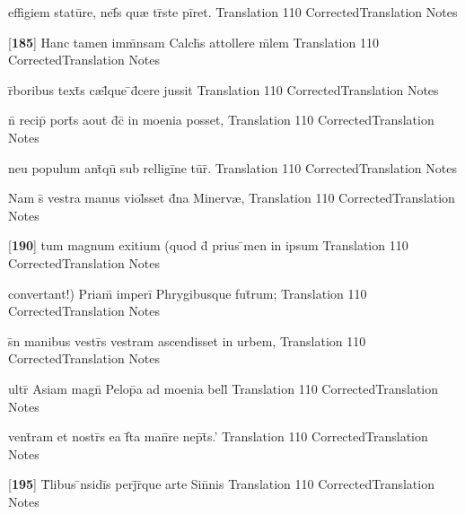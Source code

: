 \latline
  {effigiem statu\={}re, nef\={}s qu{\ae} tr\={\macron {\i}}ste pi\={}ret.}
  { Translation }
  {110}
  { CorrectedTranslation }
  { Notes }


\latline
  {[\textbf{185}] Hanc tamen imm\={}nsam Calch\={}s attollere m\={}lem}
  { Translation }
  {110}
  { CorrectedTranslation }
  { Notes }


\latline
  {r\={}boribus text\={\macron {\i}}s c{\ae}l\={}que \={}d\={}cere jussit}
  { Translation }
  {110}
  { CorrectedTranslation }
  { Notes }


\latline
  {n\={} recip\={\macron {\i}} port\={\macron {\i}}s aout d\={}c\={\macron {\i}} in moenia posset,}
  { Translation }
  {110}
  { CorrectedTranslation }
  { Notes }


\latline
  {neu populum ant\={\macron {\i}}qu\={} sub relligi\={}ne tu\={}r\={\macron {\i}}.}
  { Translation }
  {110}
  { CorrectedTranslation }
  { Notes }


\latline
  {Nam s\={\macron {\i}} vestra manus viol\={}sset d\={}na Minerv{\ae},}
  { Translation }
  {110}
  { CorrectedTranslation }
  { Notes }


\latline
  {[\textbf{190}] tum magnum exitium (quod d\={\macron {\i}} prius \={}men in ipsum}
  { Translation }
  {110}
  { CorrectedTranslation }
  { Notes }


\latline
  {convertant!) Priam\={\macron {\i}} imperi\={} Phrygibusque fut\={}rum;}
  { Translation }
  {110}
  { CorrectedTranslation }
  { Notes }


\latline
  {s\={\macron {\i}}n manibus vestr\={\macron {\i}}s vestram ascendisset in urbem,}
  { Translation }
  {110}
  { CorrectedTranslation }
  { Notes }


\latline
  {ultr\={} Asiam magn\={} Pelop\={}a ad moenia bell\={}}
  { Translation }
  {110}
  { CorrectedTranslation }
  { Notes }


\latline
  {vent\={}ram et nostr\={}s ea f\={}ta man\={}re nep\={}t\={}s.'}
  { Translation }
  {110}
  { CorrectedTranslation }
  { Notes }


\latline
  {[\textbf{195}] T\={}libus \={\macron {\i}}nsidi\={\macron {\i}}s perj\={}r\={\macron {\i}}que arte Sin\={}nis}
  { Translation }
  {110}
  { CorrectedTranslation }
  { Notes }


